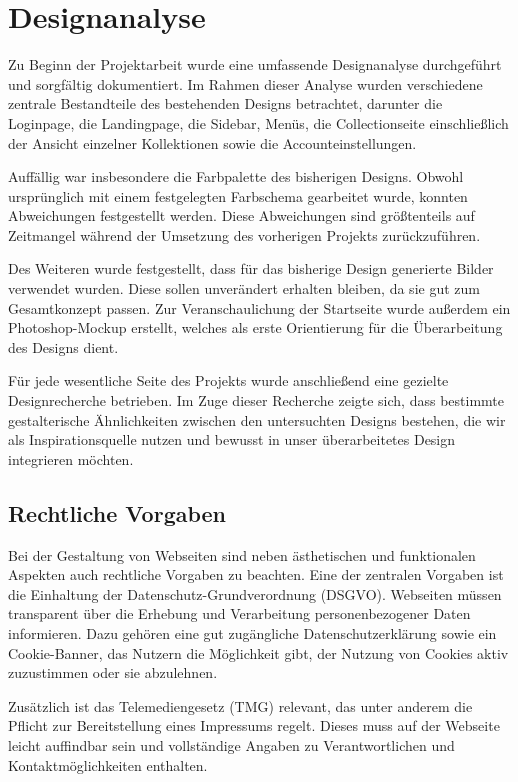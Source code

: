 \section{Designanalyse}\label{sec:section-three}

Zu Beginn der Projektarbeit wurde eine umfassende Designanalyse durchgeführt und sorgfältig dokumentiert.
Im Rahmen dieser Analyse wurden verschiedene zentrale Bestandteile des bestehenden Designs betrachtet, darunter die Loginpage, die Landingpage, die Sidebar, Menüs, die Collectionseite einschließlich der Ansicht einzelner Kollektionen sowie die Accounteinstellungen. \break


Auffällig war insbesondere die Farbpalette des bisherigen Designs.
Obwohl ursprünglich mit einem festgelegten Farbschema gearbeitet wurde, konnten Abweichungen festgestellt werden.
Diese Abweichungen sind größtenteils auf Zeitmangel während der Umsetzung des vorherigen Projekts zurückzuführen.

Des Weiteren wurde festgestellt, dass für das bisherige Design generierte Bilder verwendet wurden.
Diese sollen unverändert erhalten bleiben, da sie gut zum Gesamtkonzept passen.
Zur Veranschaulichung der Startseite wurde außerdem ein Photoshop-Mockup erstellt, welches als erste Orientierung für die Überarbeitung des Designs dient.

Für jede wesentliche Seite des Projekts wurde anschließend eine gezielte Designrecherche betrieben.
Im Zuge dieser Recherche zeigte sich, dass bestimmte gestalterische Ähnlichkeiten zwischen den untersuchten Designs bestehen, die wir als Inspirationsquelle nutzen und bewusst in unser überarbeitetes Design integrieren möchten.


\subsection{Rechtliche Vorgaben}\label{subsec:subsection-three-one}

Bei der Gestaltung von Webseiten sind neben ästhetischen und funktionalen Aspekten auch rechtliche Vorgaben zu beachten.
Eine der zentralen Vorgaben ist die Einhaltung der Datenschutz-Grundverordnung (DSGVO).
Webseiten müssen transparent über die Erhebung und Verarbeitung personenbezogener Daten informieren.
Dazu gehören eine gut zugängliche Datenschutzerklärung sowie ein Cookie-Banner, das Nutzern die Möglichkeit gibt, der Nutzung von Cookies aktiv zuzustimmen oder sie abzulehnen.

Zusätzlich ist das Telemediengesetz (TMG) relevant, das unter anderem die Pflicht zur Bereitstellung eines Impressums regelt.
Dieses muss auf der Webseite leicht auffindbar sein und vollständige Angaben zu Verantwortlichen und Kontaktmöglichkeiten enthalten.

